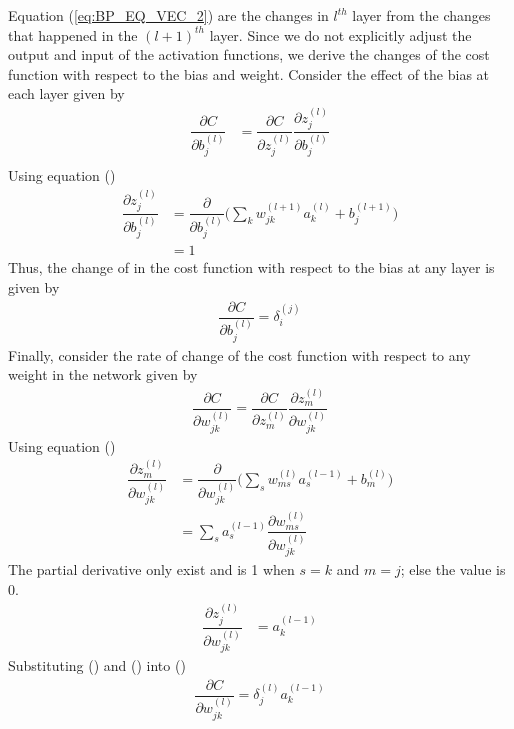 Equation (\ref{eq:BP_EQ_VEC_2}) are the changes in $l^{th}$ layer from the changes that happened in the $(l+1)^{th}$ layer. Since we do not explicitly adjust the output and input of the activation functions, we derive the changes of the cost function with respect to the bias and weight. Consider the effect of the bias at each layer given by 
\begin{align*}
  \dfrac{\partial C}{\partial b_j^{(l)}} &= \dfrac{\partial C}{\partial z_j^{(l)}} \dfrac{\partial z_j^{(l)}}{\partial b_j^{(l)}} \\
\end{align*}
Using equation ()
\begin{align*}
  \dfrac{\partial z_j^{(l)}}{\partial b_j^{(l)}} &= \dfrac{\partial}{\partial b_j^{(l)}} \Big(  \sum_kw_{jk}^{(l+1)}a_k^{(l)} + b_j^{(l+1)}  \Big) \\
  &= 1
\end{align*}
Thus, the change of in the cost function with respect to the bias at any layer is given by 
\begin{align}
  \label{eq:BP_EQ_VEC_3}
  \dfrac{\partial C}{\partial b_j^{(l)}} = \delta_i^{(j)}
\end{align}
Finally, consider the rate of change of the cost function with respect to any weight in the network given by 
\begin{align}
  \label{eq: partial_C_with_weight}
  \dfrac{\partial C}{\partial w_{jk}^{(l)}} = \dfrac{\partial C}{\partial z_m^{(l)}} \dfrac{\partial z_m^{(l)}}{\partial w_{jk}^{(l)}}
\end{align}
Using equation ()
\begin{align}
  \nonumber
  \dfrac{\partial z_m^{(l)}}{\partial w_{jk}^{(l)}} &= \dfrac{\partial}{\partial w_{jk}^{(l)}} \Big(  \sum_sw_{ms}^{(l)}a_s^{(l-1)} + b_m^{(l)}  \Big) \\
  \nonumber
  &= \sum_s a_s^{(l-1)} \dfrac{\partial w_{ms}^{(l)}}{\partial w_{jk}^{(l)}}
\end{align}
The partial derivative only exist and is 1 when $s=k$ and $m=j$; else the value is 0.
\begin{align}
  \label{eq: partial_act_weight}
  \dfrac{\partial z_j^{(l)}}{\partial w_{jk}^{(l)}} &= a_k^{(l-1)}
\end{align}
Substituting () and () into ()
\begin{align}
  \label{eq:BP_EQ_VEC_4}
  \dfrac{\partial C}{\partial w_{jk}^{(l)}} = \delta_j^{(l)}a_k^{(l-1)}
\end{align}
